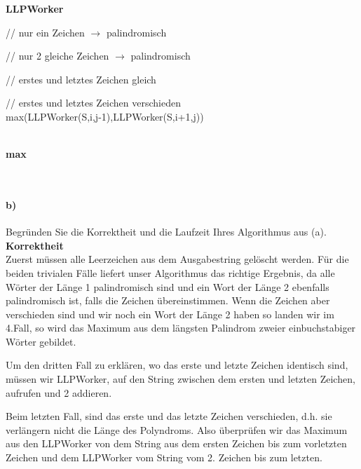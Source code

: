 \documentclass[paper=a4, fontsize=11pt]{scrartcl}
\numberwithin{equation}{section}
\numberwithin{figure}{section}
\numberwithin{table}{section}
\begin{document}
\textbf{LLPWorker} \\
\begin{algorithm}[H]
\SetAlgoLined
{}
 // nur ein Zeichen $\rightarrow$ palindromisch\\

// nur 2 gleiche Zeichen $\rightarrow$ palindromisch\\

// erstes und letztes Zeichen gleich \\

// erstes und letztes Zeichen verschieden \\
\Return max(LLPWorker(S,i,j-1),LLPWorker(S,i+1,j))
\end{algorithm} \\

\textbf{max} \\
\begin{algorithm}[H]
\SetAlgoLined
{}
\end{algorithm} \\

\paragraph{b)}
Begründen Sie die Korrektheit und die Laufzeit Ihres Algorithmus aus (a). \\

\textbf{Korrektheit} \\
Zuerst müssen alle Leerzeichen aus dem Ausgabestring gelöscht werden. Für die beiden trivialen Fälle liefert unser Algorithmus das richtige Ergebnis, da alle Wörter der Länge 1 palindromisch sind und ein Wort der Länge 2 ebenfalls palindromisch ist, falls die Zeichen übereinstimmen. Wenn die Zeichen aber verschieden sind und wir noch ein Wort der Länge 2 haben so landen wir im 4.Fall, so wird das Maximum aus dem längsten Palindrom zweier einbuchstabiger Wörter gebildet.

Um den dritten Fall zu erklären, wo das erste und letzte Zeichen identisch sind, müssen wir LLPWorker, auf den String zwischen dem ersten und letzten Zeichen, aufrufen und 2 addieren. 

Beim letzten Fall, sind das erste und das letzte Zeichen verschieden, d.h. sie verlängern nicht die Länge des Polyndroms. Also überprüfen wir das Maximum aus den LLPWorker von dem String aus dem ersten Zeichen bis zum vorletzten Zeichen und dem LLPWorker vom String vom 2. Zeichen bis zum letzten. \\
\end{document}
